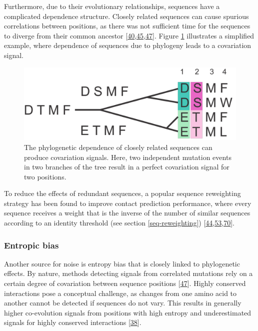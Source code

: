 \documentclass[12pt,a4paper,twoside]{book}
\theoremstyle{definition}
\theoremstyle{definition}
\theoremstyle{remark}
\begin{document}
Furthermore, due to their evolutionary relationships, sequences have a
complicated dependence structure. Closely related sequences can cause
spurious correlations between positions, as there was not sufficient
time for the sequences to diverge from their common ancestor
{[}\protect\hyperlink{ref-Gouveia_Oliveira2007}{40},\protect\hyperlink{ref-Lapedes1999}{45},\protect\hyperlink{ref-Burger2010}{47}{]}.
Figure \ref{fig:phylogenetic-effect} illustrates a simplified example,
where dependence of sequences due to phylogeny leads to a covariation
signal.






\begin{figure}

{\centering \includegraphics[width=0.5\linewidth]{img/intro/phylogenetic_effect} 

}

\caption{The phylogenetic dependence of closely
related sequences can produce covariation signals. Here, two independent
mutation events in two branches of the tree result in a perfect
covariation signal for two positions.}\label{fig:phylogenetic-effect}
\end{figure}

To reduce the effects of redundant sequences, a popular sequence
reweighting strategy has been found to improve contact prediction
performance, where every sequence receives a weight that is the inverse
of the number of similar sequences according to an identity threshold
(see section \ref{seq-reweighting})
{[}\protect\hyperlink{ref-Jones2012}{44},\protect\hyperlink{ref-Morcos2011}{53},\protect\hyperlink{ref-Buslje2009}{70}{]}.

\subsubsection*{Entropic bias}\label{entropic-bias}

Another source for noise is entropy bias that is closely linked to
phylogenetic effects. By nature, methods detecting signals from
correlated mutations rely on a certain degree of covariation between
sequence positions {[}\protect\hyperlink{ref-Burger2010}{47}{]}. Highly
conserved interactions pose a conceptual challenge, as changes from one
amino acid to another cannot be detected if sequences do not vary. This
results in generally higher co-evolution signals from positions with
high entropy and underestimated signals for highly conserved
interactions {[}\protect\hyperlink{ref-Fodor2004}{38}{]}.
\end{document}
